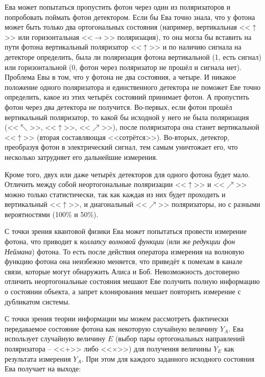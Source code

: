 Ева может попытаться пропустить фотон через один из поляризаторов и попробовать поймать фотон детектором. Если бы Ева точно знала, что у фотона может быть только два ортогональных состояния (например, вертикальная <<$\uparrow$>> или горизонтальная <<$\rightarrow$>> поляризация), то она могла бы вставить на пути фотона вертикальный поляризатор <<$\uparrow$>> и по наличию сигнала на детекторе определить, была ли поляризация фотона вертикальной (1, есть сигнал) или горизонтальной (0, фотон через поляризатор не прошёл и сигнала нет). Проблема Евы в том, что у фотона не два состояния, а четыре. И никакое положение одного поляризатора и единственного детектора не поможет Еве точно определить, какое из этих четырёх состояний принимает фотон. А пропустить фотон через два детектора не получится. Во-первых, если фотон прошёл вертикальный  поляризатор, то какой бы исходной у него не была поляризация (<<$\nwarrow$>>, <<$\uparrow$>>, <<$\nearrow$>>), после поляризатора она станет вертикальной <<$\uparrow$>> (вторая составляющая <<сотрётся>>). Во-вторых, детектор, преобразуя фотон в электрический сигнал, тем самым уничтожает его, что несколько затрудняет его дальнейшие измерения.

Кроме того, двух или даже четырёх детекторов для одного фотона будет мало. Отличить между собой неортогональные поляризации <<$\uparrow$>> и <<$\nearrow$>> можно только статистически, так как каждая из них будет проходить и вертикальный <<$\uparrow$>>, и диагональный <<$\nearrow$>> поляризаторы, но с разными вероятностями (100\% и 50\%).

С точки зрения квантовой физики Ева может попытаться провести измерение фотона, что приводит к \emph{коллапсу волновой функции} (или же \emph{редукции фон Неймана}) фотона. То есть после действия оператора измерения на волновую функцию фотона она неизбежно меняется, что приведёт к помехам в канале связи, которые могут обнаружить Алиса и Боб. Невозможность достоверно отличить неортогональные состояния мешают Еве получить полную информацию о состоянии объекта, а запрет клонирования мешает повторить измерение с дубликатом системы.

С точки зрения теории информации мы можем рассмотреть фактически передаваемое состояние фотона как некоторую случайную величину $Y_A$. Ева использует случайную величину $E$ (выбор пары ортогональных направлений поляризатора – <<+>> либо <<×>>) для получения величины $Y_E$ как результата измерения $Y_A$. При этом для каждого заданного исходного состояния Ева получает на выходе:


